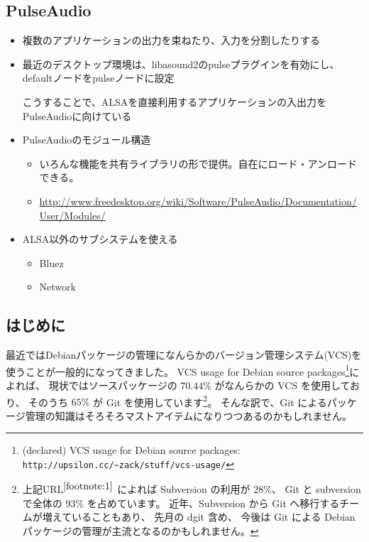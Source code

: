 \documentclass[mingoth,a4paper]{jsarticle}
\begin{document}
\subsection{PulseAudio}
\begin{itemize}
\item 複数のアプリケーションの出力を束ねたり、入力を分割したりする
\item 最近のデスクトップ環境は、libasound2のpulseプラグインを有効にし、defaultノードをpulseノードに設定

  こうすることで、ALSAを直接利用するアプリケーションの入出力をPulseAudioに向けている
\item PulseAudioのモジュール構造
  \begin{itemize}
  \item いろんな機能を共有ライブラリの形で提供。自在にロード・アンロードできる。
  \item \url{http://www.freedesktop.org/wiki/Software/PulseAudio/Documentation/User/Modules/}
  \end{itemize}
\item ALSA以外のサブシステムを使える
  \begin{itemize}
  \item Bluez
  \item Network
  \end{itemize}
\end{itemize}


\subsection{はじめに}

最近ではDebianパッケージの管理になんらかのバージョン管理システム(VCS)を使うことが一般的になってきました。
%
VCS usage for Debian source packages\footnote{%
  \label{footnote:1}
  (declared) VCS usage for Debian source packages:
  \texttt{http://upsilon.cc/\~{}zack/stuff/vcs-usage/}%
}によれば、
現状ではソースパッケージの $70.44\%$ がなんらかの VCS を使用しており、
そのうち $65\%$ が Git を使用しています\footnote{%
  上記URL$^{\ref{footnote:1}}$ によれば Subversion の利用が $28\%$、
  Git と subversion で全体の $93\%$ を占めています。
  近年、Subversion から Git へ移行するチームが増えていることもあり、
  先月の dgit 含め、
  今後は Git による Debian パッケージの管理が主流となるのかもしれません。
}。
そんな訳で、Git によるパッケージ管理の知識はそろそろマストアイテムになりつつあるのかもしれません。
\end{document}
